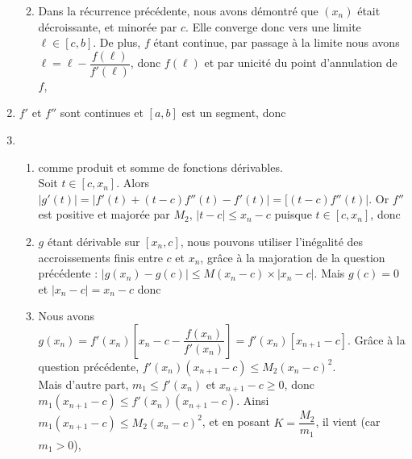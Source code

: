 \begin{enumerate}
\begin{enumerate}
\begin{center}
\end{center}
\item Dans la récurrence précédente, nous avons démontré que $(x_n)$ était décroissante, et minorée par $c$. Elle converge donc vers une limite $\ell\in[c,b]$. De plus, $f$ étant continue, par passage à la limite nous avons $\ell=\ell-\dfrac{f(\ell)}{f'(\ell)}$, donc $f(\ell)$ et par unicité du point d'annulation de $f$,
\begin{center}
\end{center}
\end{enumerate}
\item $f'$ et $f''$ sont continues et $[a,b]$ est un segment, donc
\begin{center}
\end{center}
\item 
\begin{enumerate}
\item {} comme produit et somme de fonctions dérivables.\\
Soit $t\in[c,x_n]$. Alors $|g'(t)|=|f'(t)+(t-c)f''(t)-f'(t)|=[(t-c)f''(t)|$. Or $f''$ est positive et majorée par $M_2$, $|t-c|\leq x_n-c$ puisque $t\in[c,x_n]$, donc
\begin{center}
\end{center}
\item $g$ étant dérivable sur $[x_n,c]$, nous pouvons utiliser l'inégalité des accroissements finis entre $c$ et $x_n$, grâce à la majoration de la question précédente : $|g(x_n)-g(c)|\leq M(x_n-c)\times|x_n-c|$. Mais $g(c)=0$ et $|x_n-c|=x_n-c$ donc
\begin{center}
\end{center}
\item Nous avons $g(x_n)=f'(x_n)\left[x_n-c-\dfrac{f(x_n)}{f'(x_n)}\right]=f'(x_n)\left[x_{n+1}-c\right]$. Grâce à la question précédente, $f'(x_n)(x_{n+1}-c)\leq M_2(x_n-c)^2$.\\
Mais d'autre part, $m_1\leq f'(x_n)$ et $x_{n+1}-c\geq 0$, donc $m_1(x_{n+1}-c)\leq f'(x_n)(x_{n+1}-c)$. Ainsi $m_1(x_{n+1}-c)\leq M_2(x_n-c)^2$, et en posant $K=\dfrac{M_2}{m_1}$, il vient (car $m_1>0$),
\begin{center}

\end{center}
\end{enumerate}
\end{enumerate}
